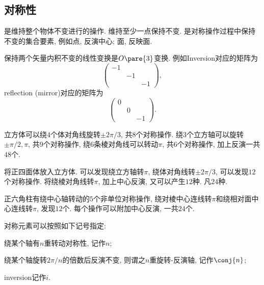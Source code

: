 \documentclass[hidelinks]{ctexart}
\begin{document}


\subsection{对称性} %
\label{sub:对称性}

是维持整个物体不变进行的操作. 维持至少一点保持不变. 是对称操作过程中保持不变的集合要素, 例如点, 反演中心; 面, 反映面.
\par
保持两个矢量内积不变的线性变换是$O\pare{3}$变换. 例如Inversion对应的矩阵为
\[ \begin{pmatrix}
    -1 & & \\
    & -1 & \\
    & & -1
\end{pmatrix}, \]
reflection (mirror)对应的矩阵为
\[ \begin{pmatrix}
    0 & & \\
    & 0 & \\
    & & -1
\end{pmatrix}. \]
\begin{sample}
    \begin{ex}
        立方体可以绕$4$个体对角线旋转$\pm 2\pi/3$, 共$8$个对称操作. 绕$3$个立方轴可以旋转$\pm \pi/2, \pi$, 共$9$个对称操作, 绕$6$条棱对角线可以转动$\pi$, 共$6$个对称操作, 加上反演一共$48$个.
    \end{ex}
\end{sample}
\begin{sample}
    \begin{ex}
        将正四面体放入立方体. 可以发现绕立方轴转$\pi$, 绕体对角线转$\pm 2\pi/3$, 可以发现$12$个对称操作. 将绕棱对角线转$\pi$, 加上中心反演, 又可以产生$12$种. 凡$24$种.
    \end{ex}
\end{sample}
\begin{sample}
    \begin{ex}
        正六角柱有绕中心轴转动的$5$个非单位对称操作, 绕对棱中心连线转$\pi$和绕相对面中心连线转$\pi$, 发现$12$个. 每个操作可以附加中心反演, 一共$24$个.
    \end{ex}
\end{sample}
对称元素可以按照如下记号指定:
\begin{cenum}
    \item 绕某个轴有$n$重转动对称性, 记作$n$;
    \item 绕某个轴旋转$2\pi/n$的倍数后反演不变, 则谓之$n$重旋转-反演轴, 记作$\conj{n}$;
    \item inversion记作$i$.
\end{cenum}
\end{document}

